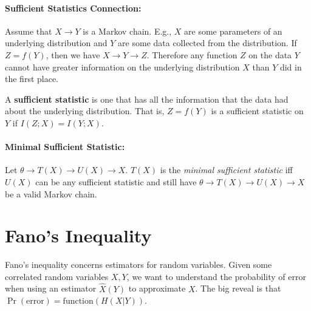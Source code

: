 \documentclass[a4paper,12pt]{report}
\begin{document}
\paragraph{Sufficient Statistics Connection: } Assume that $X \to Y$ is a Markov
chain. E.g., $X$ are some parameters of an underlying distribution and $Y$ are
some data collected from the distribution. If $Z = f(Y)$, then we have $X \to Y
\to Z$. Therefore any function $Z$ on the data $Y$ cannot have greater
information on the underlying distribution $X$ than $Y$ did in the first place. 

A \textbf{sufficient statistic} is one that has all the information that the
data had about the underlying distribution. That is, $Z = f(Y)$ is a sufficient
statistic on $Y$ if $I(Z; X) = I(Y; X)$. 

\paragraph{Minimal Sufficient Statistic: } Let $\theta \to T(X) \to U(X) \to X$.
$T(X)$ is the \textit{minimal sufficient statistic} iff $U(X)$ can be any
sufficient statistic and still have $\theta \to T(X) \to U(X) \to X$ be a valid
Markov chain. 





\section{Fano's Inequality}

Fano's inequality concerns estimators for random variables. Given some
correlated random variables $X, Y$, we want to understand the probability of
error when using an estimator $\hat X(Y)$ to approximate $X$. The big reveal is
that $\Pr(\text{error}) = \text{function}(H(X|Y))$.
\end{document}
